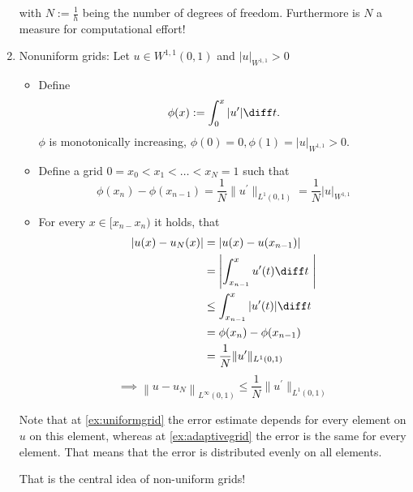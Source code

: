 \begin{example}
\begin{enumerate}[label = \Roman*)]
			with $N := \frac{1}{h}$ being the number of degrees of freedom. Furthermore is $N$ a measure for computational effort!
    \item Nonuniform grids: \label{ex:adaptivegrid}
      Let $u \in W^{1,1}(0,1)$ and $|u|_{W^{1,1}}>0$
			\begin{itemize}
				\item Define
					\begin{equation*}
            \phi(x) := \int_{0}^x |u^\prime| \diff t.
					\end{equation*}
          $\phi$ is monotonically increasing, $\phi(0)=0,\phi(1)=|u|_{W^{1,1}} > 0$.
				\item Define a grid $0 = x_{0} < x_{1}< \dots < x_{N} = 1$ such that
					\begin{equation*}
            \phi(x_{n}) - \phi(x_{n-1}) = \frac{1}{N} \|u^\prime\|_{L^1(0,1)}= \frac{1}{N} |u|_{W^{1,1}}
					\end{equation*}
				\item For every $x \in [x_{n-}x_{n})$ it holds, that
					\begin{align*}
            |u(x)-u_{N}(x)|&= |u(x)-u(x_{n-1})|\\
                                &= \left|\int_{x_{n-1}}^{x} u^\prime(t) \diff t\ \right|\\
                                &\leq \int_{x_{n-1}}^{x} |u^\prime(t)| \diff t\\\
									   &= \phi(x_{n}) - \phi(x_{n-1}) \\
                     &= \frac{1}{N} \|u^\prime\|_{L^{1}(0,1)}
					\end{align*}
					\begin{equation*}
            \implies \left\|u - u_{N}\right\|_{L^{\infty}(0,1)} \leq \frac{1}{N} \|u^\prime\|_{L^{1}(0,1)}
					\end{equation*}
			\end{itemize}
      Note that at \ref{ex:uniformgrid} the error estimate depends for every element on $u$ on this element, whereas at \ref{ex:adaptivegrid} the error is the same for every element. That means that the error is distributed evenly on all elements.

      That is the central idea of non-uniform grids!
	\end{enumerate}
\end{example}
